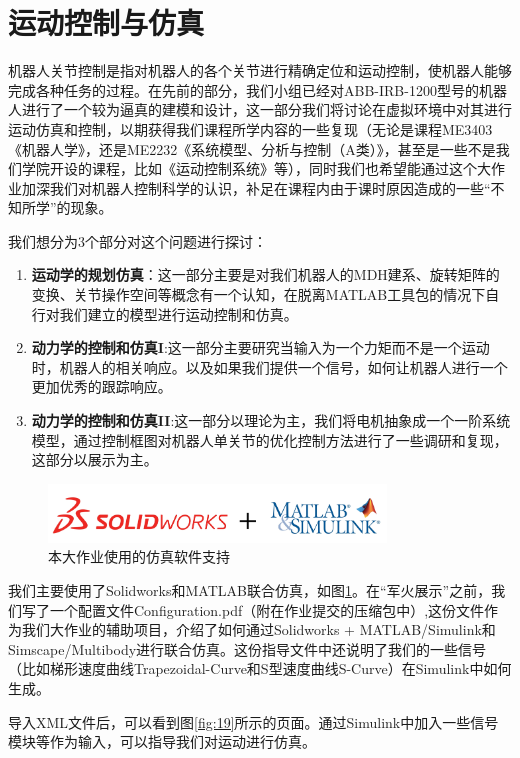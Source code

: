 \section{运动控制与仿真}
机器人关节控制是指对机器人的各个关节进行精确定位和运动控制，使机器人能够完成各种任务的过程。在先前的部分，我们小组已经对ABB-IRB-1200型号的机器人进行了一个较为逼真的建模和设计，这一部分我们将讨论在虚拟环境中对其进行运动仿真和控制，以期获得我们课程所学内容的一些复现（无论是课程ME3403《机器人学》，还是ME2232《系统模型、分析与控制（A类）》，甚至是一些不是我们学院开设的课程，比如《运动控制系统》等），同时我们也希望能通过这个大作业加深我们对机器人控制科学的认识，补足在课程内由于课时原因造成的一些“不知所学”的现象。

我们想分为3个部分对这个问题进行探讨：
\begin{enumerate}
    \item \textbf{运动学的规划仿真}：这一部分主要是对我们机器人的MDH建系、旋转矩阵的变换、关节操作空间等概念有一个认知，在脱离MATLAB工具包的情况下自行对我们建立的模型进行运动控制和仿真。
    \item \textbf{动力学的控制和仿真I}:这一部分主要研究当输入为一个力矩而不是一个运动时，机器人的相关响应。以及如果我们提供一个信号，如何让机器人进行一个更加优秀的跟踪响应。
    \item \textbf{动力学的控制和仿真II}:这一部分以理论为主，我们将电机抽象成一个一阶系统模型，通过控制框图对机器人单关节的优化控制方法进行了一些调研和复现，这部分以展示为主。
\end{enumerate}

\begin{figure}[htbp]
    \centering
    \includegraphics[width=0.8\textwidth]{Image/logo.png}
    \caption{本大作业使用的仿真软件支持}
    \label{fig:18}
\end{figure}

我们主要使用了Solidworks和MATLAB联合仿真，如图\ref{fig:18}。在“军火展示”之前，我们写了一个配置文件\textcolor{cherry}{Configuration.pdf}（附在作业提交的压缩包中）,这份文件作为我们大作业的辅助项目，介绍了如何通过Solidworks + MATLAB/Simulink和Simscape/Multibody进行联合仿真。这份指导文件中还说明了我们的一些信号（比如梯形速度曲线Trapezoidal-Curve和S型速度曲线S-Curve）在Simulink中如何生成。

导入XML文件后，可以看到图\ref{fig:19}所示的页面。通过Simulink中加入一些信号模块等作为输入，可以指导我们对运动进行仿真。

